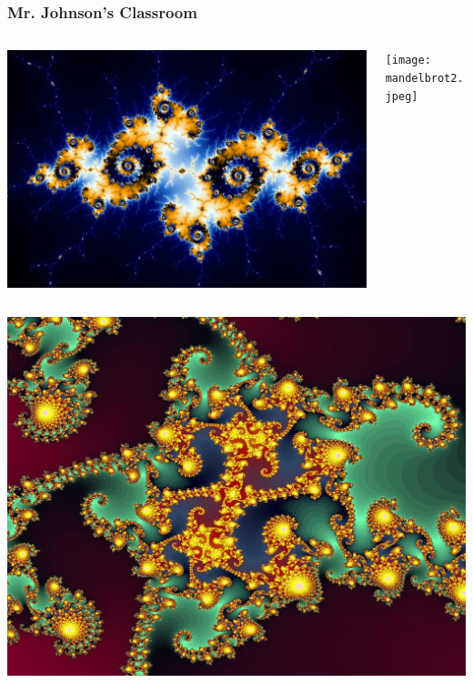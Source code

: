 \documentclass{beamer}
\theoremstyle{mystyle}
\begin{document}

\begin{frame}
\frametitle{Mr. Johnson's Classroom }

\vspace{0.1in}
\begin{columns}
	\begin{column}{0.48\textwidth}
		\includegraphics[scale=0.19]{mandelbrot.png}
	\end{column}
	\begin{column}{0.48\textwidth}
		\texttt{[image: mandelbrot2.jpeg]}
	\end{column}
\end{columns}

\begin{center}
	\includegraphics[scale=0.11]{fractal1.jpg}
\end{center}
\end{frame}
\end{document}
